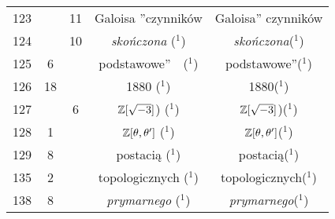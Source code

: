 \documentclass[a4paper,11pt]{article}
\numberwithin{equation}{section}
\begin{document}
\begin{center}
\begin{tabular}{|c|c|c|c|c|}
    123 & & 11 & Galoisa ”czynników  & Galoisa” czynników \\
    124 & & 10 & \textit{skończona} ($^{ 1 }$)
           & \textit{skończona}($^{ 1 }$) \\
    125 & \hphantom{0}6 & & podstawowe”~~($^{ 1 }$) & podstawowe”($^{ 1 }$) \\
    126 & 18 & & 1880 ($^{ 1 }$) & 1880($^{ 1 }$) \\
    127 & & \hphantom{0}6 & $\mathbb{Z}[ \sqrt{ -3 } ]$) ($^{ 1 }$)
           & $\mathbb{Z}[ \sqrt{ -3 } ]$)($^{ 1 }$) \\
    128 & \hphantom{0}1 & & $\mathbb{Z}[ \theta, \theta' ]$ ($^{ 1 }$)
    & $\mathbb{Z}[ \theta, \theta' ]$($^{ 1 }$) \\
    129 & \hphantom{0}8 & & postacią ($^{ 1 }$) & postacią($^{ 1 }$) \\
    135 & \hphantom{0}2 & & topologicznych ($^{ 1 }$)
    & topologicznych($^{ 1 }$) \\
    138 & \hphantom{0}8 & & \textit{prymarnego} ($^{ 1 }$)
    & \textit{prymarnego}($^{ 1 }$) \\
    \hline
  \end{tabular}





  \newpage


\end{center}
\end{document}
